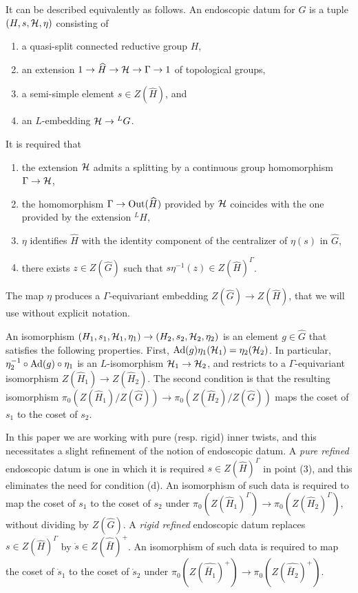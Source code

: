 \documentclass{article}
\theoremstyle{definition}
\numberwithin{equation}{section}
\renewcommand{\-}{\hyp{}}
\begin{document}
It can be described equivalently as follows. An endoscopic datum for $G$ is a tuple $(H,s,\mathcal{H},\eta)$ consisting of
\begin{enumerate}[label=(\arabic*)]
	\item a quasi-split connected reductive group $H$,
	\item an extension $1 \to \widehat H \to \mathcal{H} \to \Gamma \to 1$ of topological groups,
	\item a semi-simple element $s \in Z(\hat H)$, and
	\item an $L$\-embedding $\mathcal{H} \to {^LG}$.
\end{enumerate}
It is required that
\begin{enumerate}[label=(\alph*)]
	\item the extension $\mathcal{H}$ admits a splitting by a continuous group homomorphism $\Gamma \to \mathcal{H}$,
	\item the homomorphism $\Gamma \to \textrm{Out}(\widehat H)$ provided by $\mathcal{H}$ coincides with the one provided by the extension $^LH$,
	\item $\eta$ identifies $\hat H$ with the identity component of the centralizer of $\eta(s)$ in $\hat G$,
	\item there exists $z \in Z(\hat G)$ such that $s\eta^{-1}(z) \in Z(\hat H)^\Gamma$.
\end{enumerate}
The map $\eta$ produces a $\Gamma$-equivariant embedding $Z(\hat G) \to Z(\hat H)$, that we will use without explicit notation.

An isomorphism $(H_1,s_1,\mathcal{H}_1,\eta_1) \to (H_2,s_2,\mathcal{H}_2,\eta_2)$ is an element $g \in \hat G$ that satisfies the following properties. First, $\textrm{Ad}(g)\eta_1(\mathcal{H}_1)=\eta_2(\mathcal{H}_2)$. In particular, $\eta_2^{-1}\circ\textrm{Ad}(g)\circ\eta_1$ is an $L$\-isomorphism $\mathcal{H}_1 \to \mathcal{H}_2$, and restricts to a $\Gamma$-equivariant isomorphism $Z(\hat H_1) \to Z(\hat H_2)$. The second condition is that the resulting isomorphism $\pi_0(Z(\hat H_1)/Z(\hat G)) \to \pi_0(Z(\hat H_2)/Z(\hat G))$ maps the coset of $s_1$ to the coset of $s_2$.

In this paper we are working with pure (resp. rigid) inner twists, and this necessitates a slight refinement of the notion of endoscopic datum. A \emph{pure refined} endoscopic datum is one in which it is required $s \in Z(\hat H)^\Gamma$ in point (3), and this eliminates the need for condition (d). An isomorphism of such data is required to map the coset of $s_1$ to the coset of $s_2$ under $\pi_0(Z(\hat H_1)^\Gamma) \to \pi_0(Z(\hat H_2)^\Gamma)$, without dividing by $Z(\hat G)$. A \emph{rigid refined} endoscopic datum replaces $s \in Z(\hat H)^\Gamma$ by $\dot s \in Z(\hat{\bar H})^+$. An isomorphism of such data is required to map the coset of $\dot s_1$ to the coset of $\dot s_2$ under $\pi_0(Z(\hat{\bar H_1})^+) \to \pi_0(Z(\hat{ \bar H_2})^+)$.
\end{document}
